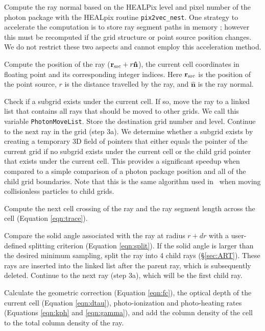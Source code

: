 \documentclass[useAMS,usenatbib,a4paper]{mn2e}
\begin{document}
 Compute the ray normal based on the HEALPix level and pixel
number of the photon package with the HEALpix routine
\texttt{pix2vec\_nest}.  One strategy to accelerate the computation is
to store ray segment paths in memory \citep{Abel02_RT,
  Krumholz07_ART}; however this must be recomputed if the grid
structure or point source position changes.  We do not restrict these
two aspects and cannot employ this acceleration method.

 Compute the position of the ray ($\mathbf{r}_{\rm src} + r
\mathbf{\hat{n}}$), the current cell coordinates in floating point and
its corresponding integer indices.  Here $\mathbf{r}_{\rm src}$ is the
position of the point source, $r$ is the distance travelled by the
ray, and $\mathbf{\hat{n}}$ is the ray normal.

 Check if a subgrid exists under the current cell.  If so,
move the ray to a linked list that contains all rays that should be
moved to other grids.  We call this variable \texttt{PhotonMoveList}.
Store the destination grid number and level.  Continue to the next ray
in the grid (step 3a).  We determine whether a subgrid exists by
creating a temporary 3D field of pointers that either equals the
pointer of the current grid if no subgrid exists under the current
cell or the child grid pointer that exists under the current cell.
This provides a significant speedup when compared to a simple
comparison of a photon package position and all of the child grid
boundaries.  Note that this is the same algorithm used in \enzo~when
moving collisionless particles to child grids.

 Compute the next cell crossing of the ray and the ray
segment length across the cell (Equation \ref{eqn:trace}).

 Compare the solid angle associated with the ray at radius
$r+dr$ with a user-defined splitting criterion (Equation
\ref{eqn:split}).  If the solid angle is larger than the desired
minimum sampling, split the ray into 4 child rays (\S\ref{sec:ART}).
These rays are inserted into the linked list after the parent ray,
which is subsequently deleted.  Continue to the next ray (step 3a),
which will be the first child ray.

 Calculate the geometric correction (Equation \ref{eqn:fc}),
the optical depth of the current cell (Equation \ref{eqn:dtau}),
photo-ionization and photo-heating rates (Equations \ref{eqn:kph} and
\ref{eqn:gamma}), and add the column density of the cell to the total
column density of the ray.
\end{document}
